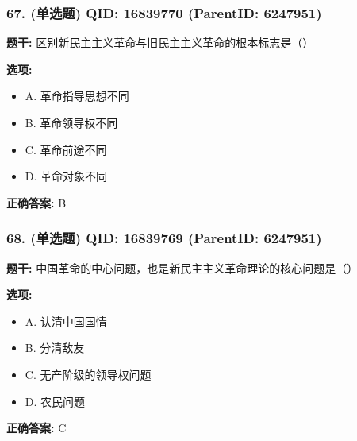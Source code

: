 \documentclass[12pt,UTF8]{ctexart}
\begin{document}
\vspace{0.3em}\hrulefill\vspace{0.7em}

\subsubsection*{67. (单选题) \small QID: 16839770 (ParentID: 6247951)}

\textbf{题干:}
区别新民主主义革命与旧民主主义革命的根本标志是（）



\textbf{选项:}
\begin{itemize}[leftmargin=*]

  \item A. 革命指导思想不同

  \item B. 革命领导权不同

  \item C. 革命前途不同

  \item D. 革命对象不同

\end{itemize}

\textbf{正确答案:}
B

\vspace{0.3em}\hrulefill\vspace{0.7em}

\subsubsection*{68. (单选题) \small QID: 16839769 (ParentID: 6247951)}

\textbf{题干:}
中国革命的中心问题，也是新民主主义革命理论的核心问题是（）



\textbf{选项:}
\begin{itemize}[leftmargin=*]

  \item A. 认清中国国情

  \item B. 分清敌友

  \item C. 无产阶级的领导权问题

  \item D. 农民问题

\end{itemize}

\textbf{正确答案:}
C

\vspace{0.3em}\hrulefill\vspace{0.7em}
\end{document}
